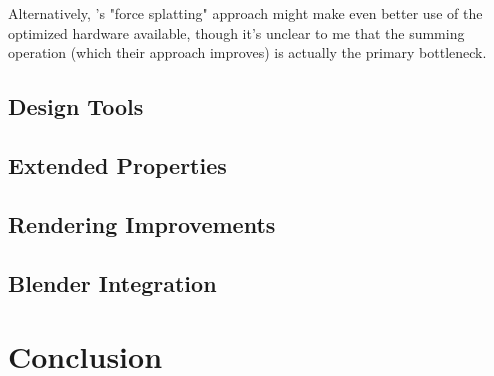 \documentclass{acmsiggraph}
\begin{document}
Alternatively, \cite{1281670}'s "force splatting" approach might make even better use of the optimized hardware available, though it's unclear to me that the summing operation (which their approach improves) is actually the primary bottleneck.

\subsection{Design Tools}

\subsection{Extended Properties}

\subsection{Rendering Improvements}

\subsection{Blender Integration}

\section{Conclusion}


\nocite{*}

\end{document}
